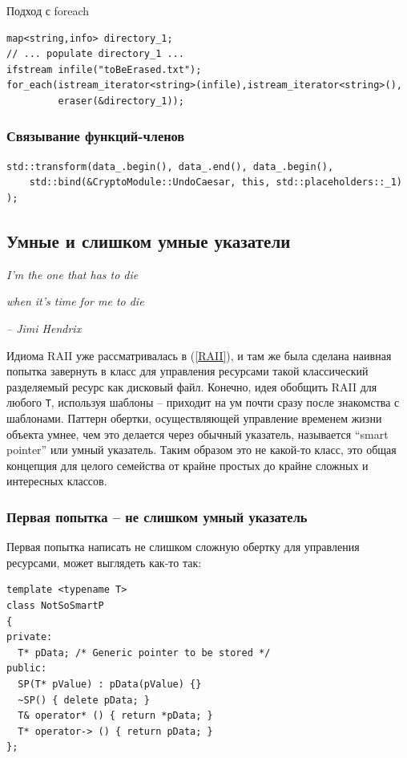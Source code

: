 \documentclass[a4paper,12pt,oneside]{article}
\begin{document}
Подход с foreach

\begin{lstlisting}
map<string,info> directory_1;
// ... populate directory_1 ...
ifstream infile("toBeErased.txt");
for_each(istream_iterator<string>(infile),istream_iterator<string>(),
         eraser(&directory_1));
\end{lstlisting}

\subsubsection{Связывание функций-членов}

\begin{lstlisting}
std::transform(data_.begin(), data_.end(), data_.begin(), 
    std::bind(&CryptoModule::UndoCaesar, this, std::placeholders::_1)
);
\end{lstlisting}

\pagebreak
\subsection{Умные и слишком умные указатели}\label{SmartPointers}

\hfill\textit{I'm the one that has to die}

\hfill\textit{when it's time for me to die}{\vspace{0.5em}}

\hfill\textit{-- Jimi Hendrix}

Идиома RAII уже рассматривалась в (\ref{RAII}), и там же была сделана наивная попытка завернуть в класс для управления ресурсами такой классический разделяемый ресурс как дисковый файл. Конечно, идея обобщить RAII для любого \lstinline!T!, используя шаблоны -- приходит на ум почти сразу после знакомства с шаблонами. Паттерн обертки, осуществляющей управление временем жизни объекта умнее, чем это делается через обычный указатель, называется ``smart pointer'' или умный указатель. Таким образом это не какой-то класс, это общая концепция для целого семейства от крайне простых до крайне сложных и интересных классов.

\subsubsection{Первая попытка -- не слишком умный указатель}

Первая попытка написать не слишком сложную обертку для управления ресурсами, может выглядеть как-то так:

\begin{lstlisting}
template <typename T> 
class NotSoSmartP
{
private:
  T* pData; /* Generic pointer to be stored */
public:
  SP(T* pValue) : pData(pValue) {}
  ~SP() { delete pData; }
  T& operator* () { return *pData; }
  T* operator-> () { return pData; }
};
\end{lstlisting}
\end{document}
